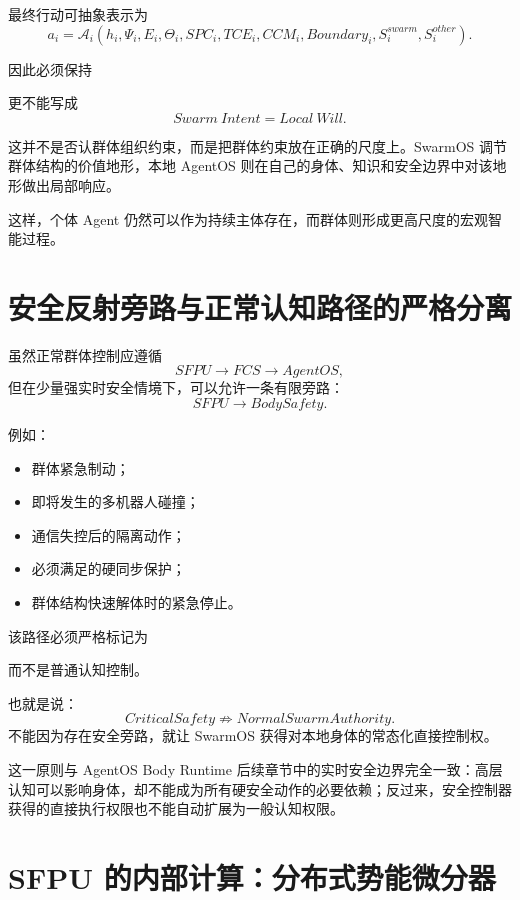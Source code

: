 最终行动可抽象表示为
\[
a_i
=
\mathcal A_i
\left(
h_i,
\Psi_i,
E_i,
\Theta_i,
SPC_i,
TCE_i,
CCM_i,
Boundary_i,
S_i^{swarm},
S_i^{other}
\right).
\]

因此必须保持
\begin{statementbox}
\centering
{}
\end{statementbox}
更不能写成
\[
Swarm\ Intent
=
Local\ Will.
\]

这并不是否认群体组织约束，而是把群体约束放在正确的尺度上。SwarmOS 调节群体结构的价值地形，本地 AgentOS 则在自己的身体、知识和安全边界中对该地形做出局部响应。

这样，个体 Agent 仍然可以作为持续主体存在，而群体则形成更高尺度的宏观智能过程。


\section{安全反射旁路与正常认知路径的严格分离}

虽然正常群体控制应遵循
\[
SFPU
\rightarrow
FCS
\rightarrow
AgentOS,
\]
但在少量强实时安全情境下，可以允许一条有限旁路：
\[
SFPU
\rightarrow
BodySafety.
\]

例如：

\begin{itemize}
    \item 群体紧急制动；
    \item 即将发生的多机器人碰撞；
    \item 通信失控后的隔离动作；
    \item 必须满足的硬同步保护；
    \item 群体结构快速解体时的紧急停止。
\end{itemize}

该路径必须严格标记为
\begin{statementbox}
\centering
{}
\end{statementbox}
而不是普通认知控制。

也就是说：
\[
CriticalSafety
\not\Rightarrow
NormalSwarmAuthority.
\]
不能因为存在安全旁路，就让 SwarmOS 获得对本地身体的常态化直接控制权。

这一原则与 AgentOS Body Runtime 后续章节中的实时安全边界完全一致：高层认知可以影响身体，却不能成为所有硬安全动作的必要依赖；反过来，安全控制器获得的直接执行权限也不能自动扩展为一般认知权限。


\section{SFPU 的内部计算：分布式势能微分器}

